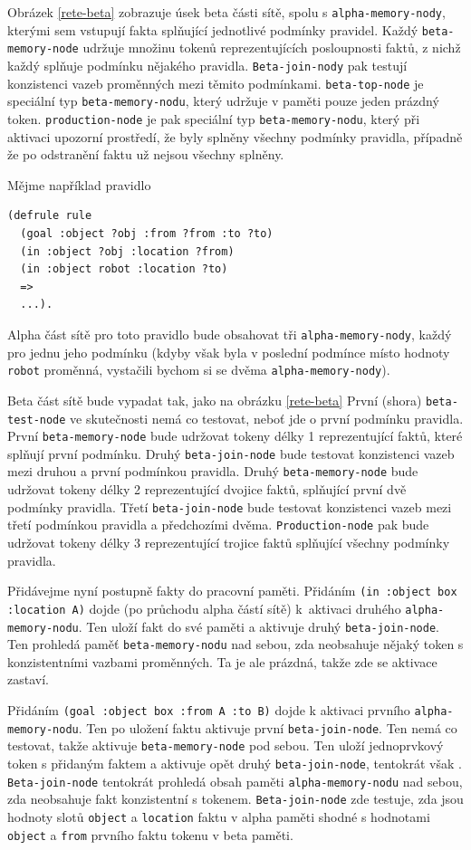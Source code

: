 Obrázek \ref{rete-beta} zobrazuje úsek beta části sítě, spolu s
\verb|alpha-memory-nody|, kterými sem vstupují fakta splňující jednotlivé
podmínky pravidel. Každý \verb|beta-memory-node| udržuje množinu tokenů
reprezentujících posloupnosti faktů, z nichž každý splňuje podmínku nějakého
pravidla. \verb|Beta-join-nody| pak testují konzistenci vazeb proměnných mezi
těmito podmínkami. \verb|beta-top-node| je speciální typ
\verb|beta-memory-nodu|, který udržuje v paměti pouze jeden prázdný token.
\verb|production-node| je pak speciální typ \verb|beta-memory-nodu|, který
při aktivaci upozorní prostředí, že byly splněny všechny podmínky pravidla,
případně že po odstranění faktu už nejsou všechny splněny.

Mějme například pravidlo
\begin{verbatim}
(defrule rule
  (goal :object ?obj :from ?from :to ?to)
  (in :object ?obj :location ?from)
  (in :object robot :location ?to)
  =>
  ...).
\end{verbatim}
Alpha část sítě pro toto pravidlo bude obsahovat tři \verb|alpha-memory-nody|,
každý pro jednu jeho podmínku (kdyby však byla v poslední podmínce místo hodnoty
\verb|robot| proměnná, vystačili bychom si se dvěma \verb|alpha-memory-nody|).

Beta část sítě bude vypadat tak, jako na obrázku \ref{rete-beta} První (shora)
\verb|beta-test-node| ve skutečnosti nemá co testovat, neboť jde o první
podmínku pravidla. První \verb|beta-memory-node| bude udržovat tokeny délky 1
reprezentující  faktů, které splňují první podmínku.  Druhý
\verb|beta-join-node| bude testovat konzistenci vazeb mezi druhou a první
podmínkou pravidla. Druhý \verb|beta-memory-node| bude udržovat tokeny délky 2
reprezentující dvojice faktů, splňující první dvě podmínky pravidla.  Třetí
\verb|beta-join-node| bude testovat konzistenci vazeb mezi třetí podmínkou
pravidla a předchozími dvěma. \verb|Production-node| pak bude udržovat tokeny
délky 3 reprezentující trojice faktů splňující všechny podmínky pravidla.

Přidávejme nyní postupně fakty do pracovní paměti. Přidáním
\verb|(in :object box :location A)| dojde (po průchodu alpha částí sítě)
k~aktivaci druhého \verb|alpha-memory-nodu|. Ten uloží fakt do své paměti a
aktivuje  druhý \verb|beta-join-node|. Ten prohledá paměť
\verb|beta-memory-nodu| nad sebou, zda neobsahuje nějaký token s konzistentními
vazbami proměnných. Ta je ale prázdná, takže zde se aktivace zastaví.

Přidáním \verb|(goal :object box :from A :to B)| dojde k aktivaci prvního
\verb|alpha-memory-nodu|. Ten po uložení faktu aktivuje první
\verb|beta-join-node|. Ten nemá co testovat, takže aktivuje
\verb|beta-memory-node| pod sebou. Ten uloží jednoprvkový token s přidaným
faktem a aktivuje opět druhý \verb|beta-join-node|, tentokrát však .
\verb|Beta-join-node| tentokrát prohledá obsah paměti \verb|alpha-memory-nodu|
nad sebou, zda neobsahuje fakt konzistentní s tokenem. \verb|Beta-join-node| zde
testuje, zda jsou hodnoty slotů \verb|object| a \verb|location| faktu v alpha
paměti shodné s hodnotami \verb|object| a \verb|from| prvního faktu tokenu v
beta paměti.

